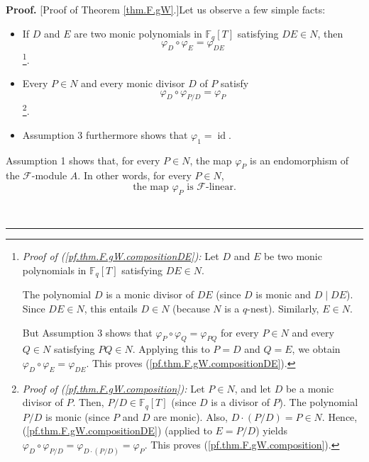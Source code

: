 \documentclass[numbers=enddot,12pt,final,onecolumn,notitlepage]{scrartcl}%
\theoremstyle{definition}
\newenvironment{proof}[1][Proof]{\noindent\textbf{#1.} }{\ \rule{0.5em}{0.5em}}
\begin{document}
\begin{proof}
[Proof of Theorem \ref{thm.F.gW}.]Let us observe a few simple facts:

\begin{itemize}
\item If $D$ and $E$ are two monic polynomials in $\mathbb{F}_{q}\left[
T\right]  $ satisfying $DE\in N$, then%
\begin{equation}
\varphi_{D}\circ\varphi_{E}=\varphi_{DE} \label{pf.thm.F.gW.compositionDE}%
\end{equation}
\footnote{\textit{Proof of (\ref{pf.thm.F.gW.compositionDE}):} Let $D$ and $E$
be two monic polynomials in $\mathbb{F}_{q}\left[  T\right]  $ satisfying
$DE\in N$.
\par
The polynomial $D$ is a monic divisor of $DE$ (since $D$ is monic and $D\mid
DE$). Since $DE\in N$, this entails $D\in N$ (because $N$ is a $q$-nest).
Similarly, $E\in N$.
\par
But Assumption 3 shows that $\varphi_{P}\circ\varphi_{Q}=\varphi_{PQ}$ for
every $P\in N$ and every $Q\in N$ satisfying $PQ\in N$. Applying this to $P=D$
and $Q=E$, we obtain $\varphi_{D}\circ\varphi_{E}=\varphi_{DE}$. This proves
(\ref{pf.thm.F.gW.compositionDE}).}.

\item Every $P\in N$ and every monic divisor $D$ of $P$ satisfy
\begin{equation}
\varphi_{D}\circ\varphi_{P/D}=\varphi_{P} \label{pf.thm.F.gW.composition}%
\end{equation}
\footnote{\textit{Proof of (\ref{pf.thm.F.gW.composition}):} Let $P\in N$, and
let $D$ be a monic divisor of $P$. Then, $P/D\in\mathbb{F}_{q}\left[
T\right]  $ (since $D$ is a divisor of $P$). The polynomial $P/D$ is monic
(since $P$ and $D$ are monic). Also, $D\cdot\left(  P/D\right)  =P\in N$.
Hence, (\ref{pf.thm.F.gW.compositionDE}) (applied to $E=P/D$) yields
$\varphi_{D}\circ\varphi_{P/D}=\varphi_{D\cdot\left(  P/D\right)  }%
=\varphi_{P}$. This proves (\ref{pf.thm.F.gW.composition}).}.

\item Assumption 3 furthermore shows that $\varphi_{1}=\operatorname*{id}$.
\end{itemize}

Assumption 1 shows that, for every $P\in N$, the map $\varphi_{P}$ is an
endomorphism of the $\mathcal{F}$-module $A$. In other words, for every $P\in
N$,%
\begin{equation}
\text{the map }\varphi_{P}\text{ is }\mathcal{F}\text{-linear.}
\label{pf.thm.F.gW.Flin}%
\end{equation}



\end{proof}
\end{document}
